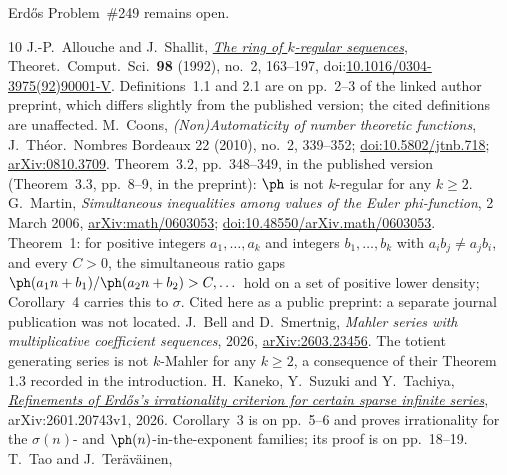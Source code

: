 Erd\H{o}s Problem~\#249 remains open.



\begin{thebibliography}{10}
 J.-P.~Allouche and J.~Shallit,
  \href{https://cs.uwaterloo.ca/~shallit/Papers/as0.pdf}{\emph{The ring of
  $k$-regular sequences}}, Theoret.\ Comput.\ Sci.\ \textbf{98} (1992),
  no.~2, 163--197,
  doi:\href{https://doi.org/10.1016/0304-3975(92)90001-V}
  {10.1016/0304-3975(92)90001-V}.  Definitions~1.1 and 2.1 are on
  pp.~2--3 of the linked author preprint, which differs slightly from the
  published version; the cited definitions are unaffected.
 M.~Coons, \emph{(Non)Automaticity of number theoretic
  functions}, J.~Th\'eor.\ Nombres Bordeaux 22 (2010), no.~2, 339--352;
  \href{https://doi.org/10.5802/jtnb.718}{doi:10.5802/jtnb.718};
  \href{https://arxiv.org/abs/0810.3709}{arXiv:0810.3709}.  Theorem~3.2,
  pp.~348--349, in the published version (Theorem~3.3, pp.~8--9, in the
  preprint): $\ph$ is not $k$-regular for any $k\ge2$.
 G.~Martin, \emph{Simultaneous inequalities
  among values of the Euler phi-function}, 2 March 2006,
  \href{https://arxiv.org/abs/math/0603053}{arXiv:math/0603053};
  \href{https://doi.org/10.48550/arXiv.math/0603053}{doi:10.48550/arXiv.math/0603053}.
  Theorem~1: for positive integers $a_1,\dots,a_k$ and integers $b_1,\dots,b_k$
  with $a_ib_j\neq a_jb_i$, and every $C>0$, the simultaneous ratio gaps
  $\ph(a_1n+b_1)/\ph(a_2n+b_2)>C,\dots$ hold on a set of positive lower density;
  Corollary~4 carries this to $\sigma$.  Cited here as a public preprint: a
  separate journal publication was not located.
 J.~Bell and D.~Smertnig, \emph{Mahler series with
  multiplicative coefficient sequences}, 2026,
  \href{https://doi.org/10.48550/arXiv.2603.23456}{arXiv:2603.23456}.  The
  totient generating series is not $k$-Mahler for any $k\ge2$, a consequence
  of their Theorem 1.3 recorded in the introduction.
 H.~Kaneko, Y.~Suzuki and Y.~Tachiya,
  \href{https://arxiv.org/abs/2601.20743}
  {\emph{Refinements of Erd\H{o}s's irrationality criterion for certain
  sparse infinite series}}, arXiv:2601.20743v1, 2026.
  Corollary~3 is on pp.~5--6 and proves irrationality for the
  \(\sigma(n)\)- and \(\ph(n)\)-in-the-exponent families; its proof is on
  pp.~18--19.
 T.~Tao and J.~Ter\"av\"ainen,

\end{thebibliography}
